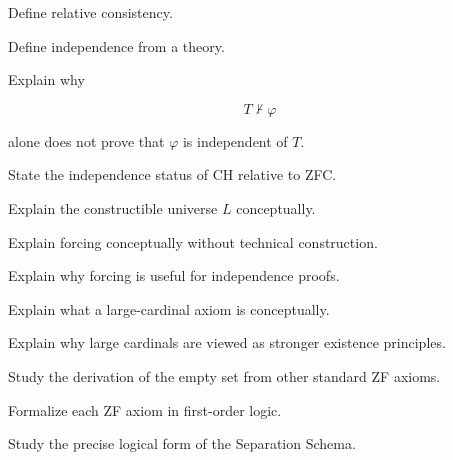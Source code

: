 \begin{exercise}[3]
Define relative consistency.
\end{exercise}

\begin{exercise}[3]
Define independence from a theory.
\end{exercise}

\begin{exercise}[3]
Explain why

\[
T\nvdash\varphi
\]

alone does not prove that \(\varphi\) is independent of \(T\).
\end{exercise}

\begin{exercise}[3]
State the independence status of CH relative to ZFC.
\end{exercise}

\begin{exercise}[3]
Explain the constructible universe \(L\) conceptually.
\end{exercise}

\begin{exercise}[3]
Explain forcing conceptually without technical construction.
\end{exercise}

\begin{exercise}[3]
Explain why forcing is useful for independence proofs.
\end{exercise}

\begin{exercise}[3]
Explain what a large-cardinal axiom is conceptually.
\end{exercise}

\begin{exercise}[3]
Explain why large cardinals are viewed as stronger existence principles.
\end{exercise}

\begin{exercise}[4]
Study the derivation of the empty set from other standard ZF axioms.
\end{exercise}

\begin{exercise}[4]
Formalize each ZF axiom in first-order logic.
\end{exercise}

\begin{exercise}[4]
Study the precise logical form of the Separation Schema.
\end{exercise}

